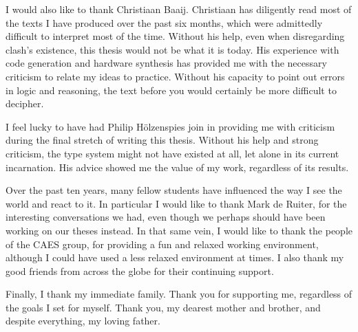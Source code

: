 \documentclass[a4paper, 11pt,oldfontcommands]{memoir}
\begin{document}
I would also like to thank Christiaan Baaij.
Christiaan has diligently read most of the texts I have produced over the past six months, which were admittedly difficult to interpret most of the time.
Without his help, even when disregarding \gls{clash}'s existence, this thesis would not be what it is today.
His experience with code generation and hardware synthesis has provided me with the necessary criticism to relate my ideas to practice.
Without his capacity to point out errors in logic and reasoning, the text before you would certainly be more difficult to decipher.

I feel lucky to have had Philip H\"olzenspies join in providing me with criticism during the final stretch of writing this thesis.
Without his help and strong criticism, the type system might not have existed at all, let alone in its current incarnation.
His advice showed me the value of my work, regardless of its results.

Over the past ten years, many fellow students have influenced the way I see the world and react to it.
In particular I would like to thank Mark de Ruiter, for the interesting conversations we had, even though we perhaps should have been working on our theses instead.
In that same vein, I would like to thank the people of the CAES group, for providing a fun and relaxed working environment, although I could have used a less relaxed environment at times.
I also thank my good friends from across the globe for their continuing support. 

Finally, I thank my immediate family. 
Thank you for supporting me, regardless of the goals I set for myself.
Thank you, my dearest mother and brother, and despite everything, my loving father.

\cleardoublepage

\fancyhead{}  %
\rhead{\thepage}  %
\lhead{}  %

\tableofcontents  %
\cleardoublepage
\end{document}
